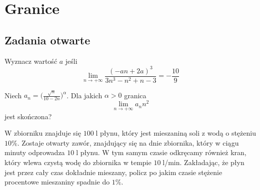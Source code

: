\setcounter{parc}{0}
\addtocounter{chapc}{1}

\chapter{Granice}

\section{Zadania otwarte}

\zadanie Wyznacz wartość $a$ jeśli \[ \lim_{n \to +\infty} \dfrac{(-an + 2a)^3}{3n^3 - n^2 + n - 3} = - \dfrac{10}{9} \]

\zadanie Niech $a_n = \big(\frac{\sqrt{n}}{10 - 2n}\big)^\alpha$. Dla jakich $\alpha > 0$ granica \[ \lim_{n \to +\infty} a_nn^2 \] jest skończona?

\zadanie W zbiorniku znajduje się $100\;$l płynu, który jest mieszaniną soli z wodą o stężeniu $10\%$. Zostaje otwarty zawór, znajdujący się na dnie zbiornika, który w ciągu minuty odprowadza $10\;$l płynu. W tym samym czasie odkręcamy również kran, który wlewa czystą wodę do zbiornika w tempie {$10\;$l/min.} Zakładając, że płyn jest przez cały czas dokładnie mieszany, policz po jakim czasie stężenie procentowe mieszaniny spadnie do $1\%$. %